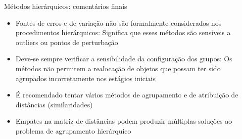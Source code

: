\documentclass[
  ignorenonframetext,
  aspectratio=169,
]{beamer}
\providecommand{\tightlist}{%
  \setlength{\itemsep}{0pt}\setlength{\parskip}{0pt}}
\begin{document}
\begin{frame}{Métodos hierárquicos: comentários finais}
\protect{}\label{muxe9todos-hieruxe1rquicos-comentuxe1rios-finais}
\begin{itemize}
\tightlist
\item
  Fontes de erros e de variação não são formalmente considerados nos
  procedimentos hierárquicos: Significa que esses métodos são sensíveis
  a outliers ou pontos de perturbação
\end{itemize}

\pause

\begin{itemize}
\tightlist
\item
  Deve-se sempre verificar a sensibilidade da configuração dos grupos:
  Os métodos não permitem a realocação de objetos que possam ter sido
  agrupados incorretamente nos estágios iniciais
\end{itemize}

\pause

\begin{itemize}
\tightlist
\item
  É recomendado tentar vários métodos de agrupamento e de atribuição de
  distâncias (similaridades)
\end{itemize}

\pause

\begin{itemize}
\tightlist
\item
  Empates na matriz de distâncias podem produzir múltiplas soluções ao
  problema de agrupamento hierárquico
\end{itemize}
\end{frame}
\end{document}
